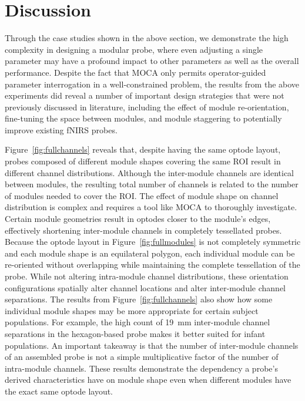 \section{Discussion}
\label{sec:discussion}
Through the case studies shown in the above section, we demonstrate the high complexity in designing a modular probe, where even adjusting a single parameter may have a profound impact to other parameters as well as the overall performance. Despite the fact that \ac{MOCA} only permits operator-guided parameter interrogation in a well-constrained problem, the results from the above experiments did reveal a number of important design strategies that were not previously discussed in literature, including the effect of module re-orientation, fine-tuning the space between modules, and module staggering to potentially improve existing \ac{fNIRS} probes.

Figure~\ref{fig:fullchannels} reveals that, despite having the same optode layout, probes composed of different module shapes covering the same \ac{ROI} result in different channel distributions. Although the inter-module channels are identical between modules, the resulting total number of channels is related to the number of modules needed to cover the \ac{ROI}. The effect of module shape on channel distribution is complex and requires a tool like \ac{MOCA} to thoroughly investigate. Certain module geometries result in optodes closer to the module's edges, effectively shortening inter-module channels in completely tessellated probes. Because the optode layout in Figure~\ref{fig:fullmodules} is not completely symmetric and each module shape is an equilateral polygon, each individual module can be re-oriented without overlapping while maintaining the complete tessellation of the probe. While not altering intra-module channel distributions, these orientation configurations spatially alter channel locations and alter inter-module channel separations. The results from Figure~\ref{fig:fullchannels} also show how some individual module shapes may be more appropriate for certain subject populations. For example, the high count of 19~mm inter-module channel separations in the hexagon-based probe makes it better suited for infant populations. An important takeaway is that the number of inter-module channels of an assembled probe is not a simple multiplicative factor of the number of intra-module channels. These results demonstrate the dependency a probe's derived characteristics have on module shape even when different modules have the exact same optode layout. 

